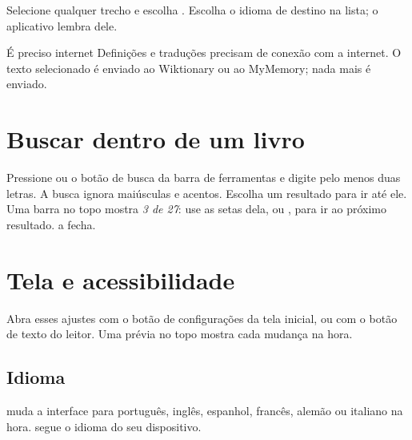 \documentclass[11pt]{article}
\begin{document}
Selecione qualquer trecho e escolha . Escolha o idioma de destino na lista; o
aplicativo lembra dele.

\begin{note}{É preciso internet}
Definições e traduções precisam de conexão com a internet. O texto selecionado é enviado ao
Wiktionary ou ao MyMemory; nada mais é enviado.
\end{note}

\section{Buscar dentro de um livro}\label{sec:search}

Pressione  ou o botão de busca da barra de ferramentas e digite pelo menos duas
letras. A busca ignora maiúsculas e acentos. Escolha um resultado para ir até ele. Uma barra no
topo mostra \emph{3 de 27}: use as setas dela, ou , para ir ao próximo resultado.
 a fecha.

\section{Tela e acessibilidade}\label{sec:display}

Abra esses ajustes com o botão de configurações da tela inicial, ou com o botão de texto do
leitor. Uma prévia no topo mostra cada mudança na hora.


\subsection{Idioma}
 muda a interface para português, inglês, espanhol, francês, alemão ou italiano
na hora.  segue o idioma do seu dispositivo.
\end{document}
